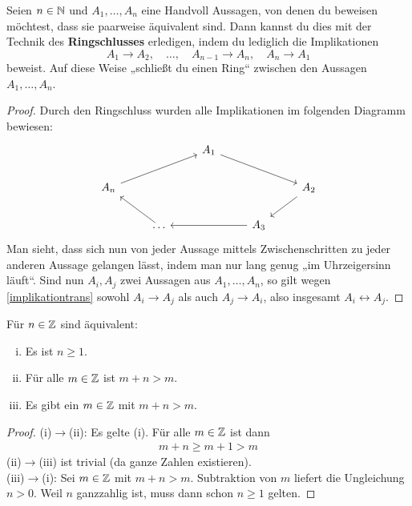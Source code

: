 \begin{satz}[Ringschluss] \label{ringschluss} 
    Seien $n\in \mathbb N$ und $A_1,\dots , A_n$ eine Handvoll Aussagen, von denen du beweisen möchtest, dass sie paarweise äquivalent sind. Dann kannst du dies mit der Technik des \textbf{Ringschlusses} erledigen, indem du lediglich die Implikationen
        \[ A_1\to A_2,\quad \dots ,\quad A_{n-1}\to A_n,\quad A_n\to A_1 \]
    beweist. Auf diese Weise „schließt du einen Ring“ zwischen den Aussagen $A_1,\dots , A_n$.
\end{satz}
\begin{proof}
    Durch den Ringschluss wurden alle Implikationen im folgenden Diagramm bewiesen:
    \[\begin{tikzcd}
        &&& A_1 \ar[rrd] &&& \\
        &A_n\ar[rru]&&&& A_2 \ar[ld]& \\
        && \dots \ar[lu] && A_3 \ar[ll]&& 
    \end{tikzcd} \]
    Man sieht, dass sich nun von jeder Aussage mittels Zwischenschritten zu jeder anderen Aussage gelangen lässt, indem man nur lang genug „im Uhrzeigersinn läuft“. Sind nun $A_i,A_j$ zwei Aussagen aus $A_1,\dots , A_n$, so gilt wegen \cref{implikationtrans} sowohl $A_i\to A_j$ als auch $A_j\to A_i$, also insgesamt $A_i\leftrightarrow A_j$.
\end{proof}


\begin{bsp} \label{bsp:ringschluss}
    Für $n\in \mathbb Z$ sind äquivalent:
    \begin{enumerate}[(i)]
        \item Es ist $n\ge 1$.
        \item Für alle $m\in \mathbb Z$ ist $m+n>m$.
        \item Es gibt ein $m\in \mathbb Z$ mit $m+n>m$.
    \end{enumerate}
\end{bsp}
\begin{proof}
    (i)$\to$(ii): Es gelte (i). Für alle $m\in \mathbb Z$ ist dann
    \begin{align*}
        m+n \ge m+1 > m
    \end{align*}
    (ii)$\to$(iii) ist trivial (da ganze Zahlen existieren). \\[0.5em]
    (iii)$\to$(i): Sei $m\in \mathbb Z$ mit $m+n>m$. Subtraktion von $m$ liefert die Ungleichung $n>0$. Weil $n$ ganzzahlig ist, muss dann schon $n\ge 1$ gelten.
\end{proof}


